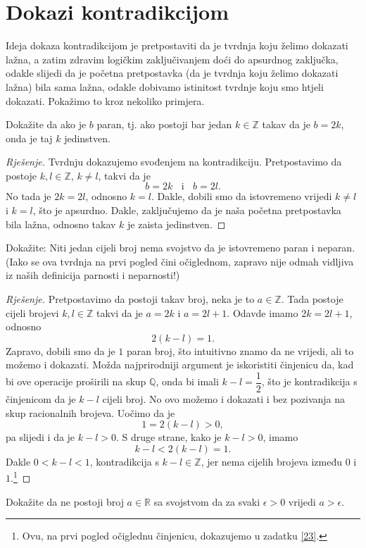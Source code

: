 \section{Dokazi kontradikcijom}
Ideja dokaza kontradikcijom je pretpostaviti da je tvrdnja koju želimo dokazati lažna, a zatim zdravim logičkim zaključivanjem doći do apsurdnog zaključka, odakle slijedi da je početna pretpostavka (da je tvrdnja koju želimo dokazati lažna) bila sama lažna, odakle dobivamo istinitost tvrdnje koju smo htjeli dokazati. Pokažimo to kroz nekoliko primjera.
\begin{exercise}
Dokažite da ako je $b$ paran, tj. ako postoji bar jedan $k\in \mathbb{Z}$ takav da je $b=2k$, onda je taj $k$ jedinstven.
\end{exercise}
\begin{proof}[Rješenje]
Tvrdnju dokazujemo svođenjem na kontradikciju. Pretpostavimo da postoje $k, l\in \mathbb{Z}$, $k\neq l$, takvi da je $$b=2k\;\;\text{ i }\;\;b=2l.$$ No tada je $2k=2l$, odnosno $k=l$. Dakle, dobili smo da istovremeno vrijedi $k\neq l$ i $k=l$, što je apsurdno. Dakle, zaključujemo da je naša početna pretpostavka bila lažna, odnosno takav $k$ je zaista jedinstven.
\end{proof}
\begin{exercise}
Dokažite: Niti jedan cijeli broj nema svojstvo da je istovremeno paran i neparan. (Iako se ova tvrdnja na prvi pogled čini očiglednom, zapravo nije odmah vidljiva iz naših definicija parnosti i neparnosti!)
\end{exercise}
\begin{proof}[Rješenje]
Pretpostavimo da postoji takav broj, neka je to $a\in \mathbb{Z}$. Tada postoje cijeli brojevi $k, l\in \mathbb{Z}$ takvi da je $a=2k$ i $a=2l+1$. Odavde imamo $2k=2l+1$, odnosno 
$$2(k-l)=1.$$
Zapravo, dobili smo da je $1$ paran broj, što intuitivno znamo da ne vrijedi, ali to možemo i dokazati. Možda najprirodniji argument je iskoristiti činjenicu da, kad bi ove operacije proširili na skup $\mathbb{Q}$, onda bi imali $k-l=\dfrac{1}{2}$, što je kontradikcija s činjenicom da je $k-l$ cijeli broj. No ovo možemo i dokazati i bez pozivanja na skup racionalnih brojeva. Uočimo da je $$1=2(k-l)>0,$$ pa slijedi i da je $k-l>0$. S druge strane, kako je $k-l>0$, imamo $$k-l<2(k-l)=1.$$ Dakle $0<k-l<1$, kontradikcija s $k-l\in \mathbb{Z}$, jer nema cijelih brojeva između $0$ i $1$.\footnote{Ovu, na prvi pogled očiglednu činjenicu, dokazujemo u zadatku \ref{23}.}
\end{proof}
\begin{exercise}
Dokažite da ne postoji broj $a\in \mathbb{R}$ sa svojstvom da za svaki $\epsilon>0$ vrijedi $a>\epsilon$.
\end{exercise}
